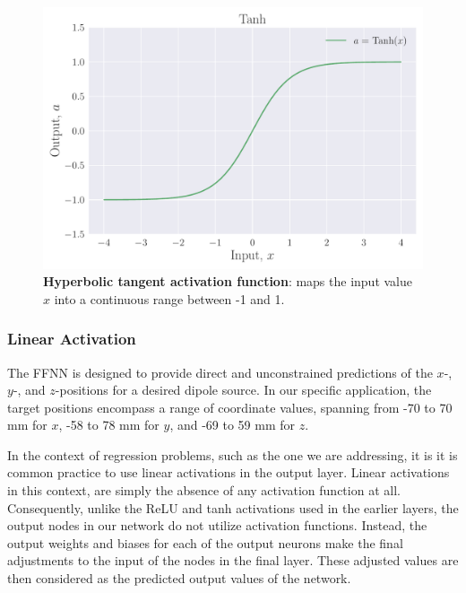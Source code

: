 \documentclass[a4paper, UKenglish, 11pt]{uiomaster}
\begin{document}
\begin{figure}
    \centering
    \includegraphics[width=\linewidth]{figures/Tanh.pdf}
    \caption{\textbf{Hyperbolic tangent activation function}: maps the input value $x$ into a continuous range between -1 and 1.}
    \label{fig:Tanh}
\end{figure}



\subsubsection{Linear Activation}
The FFNN is designed to provide direct and unconstrained predictions of the $x$-, $y$-, and $z$-positions for a desired dipole source. In our specific application, the target positions encompass a range of coordinate values, spanning from -70 to 70 mm for $x$, -58 to 78 mm for $y$, and -69 to 59 mm for $z$.

In the context of regression problems, such as the one we are addressing, it is it is common practice to use linear activations in the output layer. Linear activations in this context, are simply the absence of any activation function at all. Consequently, unlike the ReLU and tanh activations used in the earlier layers, the output nodes in our network do not utilize activation functions. Instead, the output weights and biases for each of the output neurons make the final adjustments to the input of the nodes in the final layer. These adjusted values are then considered as the predicted output values of the network.
\end{document}
